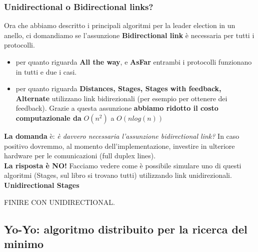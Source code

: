 \documentclass[12pt]{article}
\begin{document}
		\subsubsection{Unidirectional o Bidirectional links?}
			Ora che abbiamo descritto i principali algoritmi per la leader election in un anello, ci domandiamo se l'assunzione \textbf{Bidirectional link} è necessaria per tutti i protocolli.
			\begin{itemize}
				\item per quanto riguarda \textbf{All the way}, e \textbf{AsFar} entrambi i protocolli funzionano in tutti e due i casi.
				\item per quanto riguarda \textbf{Distances, Stages, Stages with feedback, Alternate} utilizzano link bidirezionali (per esempio per ottenere dei feedback). Grazie a questa assunzione \textbf{abbiamo ridotto il costo computazionale da} $O(n^2)$ a $O(nlog(n))$
			\end{itemize}
			\textbf{La domanda} è: \textit{è davvero necessaria l'assunzione bidirectional link?}
			In caso positivo dovremmo, al momento dell'implementazione, investire in ulteriore hardware per le comunicazioni (full duplex lines).\\
			\textbf{La risposta è NO!}
			Facciamo vedere come è possibile simulare uno di questi algoritmi (Stages, sul libro si trovano tutti) utilizzando link unidirezionali.
			\textbf{Unidirectional Stages}
			
			FINIRE CON UNIDIRECTIONAL.
			
	\subsection{Yo-Yo: algoritmo distribuito per la ricerca del minimo}
		
\end{document}
